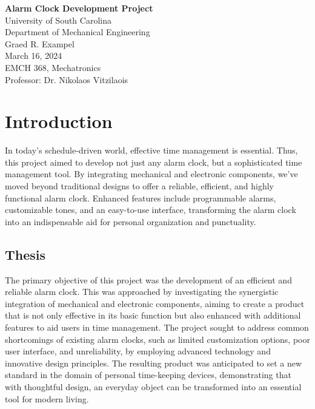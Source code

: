 \documentclass[12pt,a4paper]{article}
\begin{document}
\begin{titlepage}
    \centering
    \vspace*{0cm}
    \Huge{\textbf{Alarm Clock Development Project}}\\
    \Large{University of South Carolina}\\
    \Large{Department of Mechanical Engineering}\\

    \vspace{18cm}
    \normalsize{Graed R. Exampel}\\
    \vspace{0.1cm}
    \normalsize{March 16, 2024}\\
    \vspace{0.5cm}
    \normalsize{EMCH 368, Mechatronics}\\
    \vspace{0.1cm}
    \normalsize{Professor: Dr. Nikolaos Vitzilaois}\\
    \vfill
\end{titlepage}

\newpage

\section{Introduction}
In today's schedule-driven world, effective time management is essential. Thus, this project aimed to develop not just any alarm clock, but a sophisticated time management tool. By integrating mechanical and electronic components, we've moved beyond traditional designs to offer a reliable, efficient, and highly functional alarm clock. Enhanced features include programmable alarms, customizable tones, and an easy-to-use interface, transforming the alarm clock into an indispensable aid for personal organization and punctuality.


\subsection{Thesis}
The primary objective of this project was the development of an efficient and reliable alarm clock. This was approached by investigating the synergistic integration of mechanical and electronic components, aiming to create a product that is not only effective in its basic function but also enhanced with additional features to aid users in time management. The project sought to address common shortcomings of existing alarm clocks, such as limited customization options, poor user interface, and unreliability, by employing advanced technology and innovative design principles. The resulting product was anticipated to set a new standard in the domain of personal time-keeping devices, demonstrating that with thoughtful design, an everyday object can be transformed into an essential tool for modern living.
\end{document}
